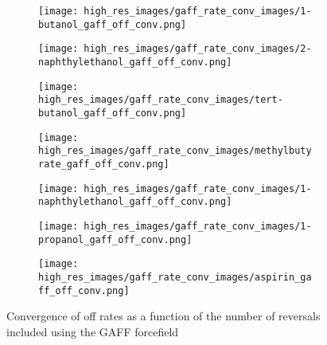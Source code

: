 \begin{figure}
\centering
	\begin{subfigure}{0.3\linewidth}
	\texttt{[image: high\_res\_images/gaff\_rate\_conv\_images/1-butanol\_gaff\_off\_conv.png]}
	\end{subfigure}%
	\begin{subfigure}{0.3\linewidth}
		\texttt{[image: high\_res\_images/gaff\_rate\_conv\_images/2-naphthylethanol\_gaff\_off\_conv.png]}
	\end{subfigure}%
	\begin{subfigure}{0.3\linewidth}
		\texttt{[image: high\_res\_images/gaff\_rate\_conv\_images/tert-butanol\_gaff\_off\_conv.png]}
	\end{subfigure}
	\begin{subfigure}{0.3\linewidth}
		\texttt{[image: high\_res\_images/gaff\_rate\_conv\_images/methylbutyrate\_gaff\_off\_conv.png]}
	\end{subfigure}
	\begin{subfigure}{0.3\linewidth}
		\texttt{[image: high\_res\_images/gaff\_rate\_conv\_images/1-naphthylethanol\_gaff\_off\_conv.png]}
	\end{subfigure}
	\begin{subfigure}{0.3\linewidth}
		\texttt{[image: high\_res\_images/gaff\_rate\_conv\_images/1-propanol\_gaff\_off\_conv.png]}
	\end{subfigure}
	\begin{subfigure}{0.3\linewidth}
		\texttt{[image: high\_res\_images/gaff\_rate\_conv\_images/aspirin\_gaff\_off\_conv.png]}
	\end{subfigure}
	\caption{Convergence of off rates as a function of the number of reversals included using the GAFF forcefield}
\end{figure}